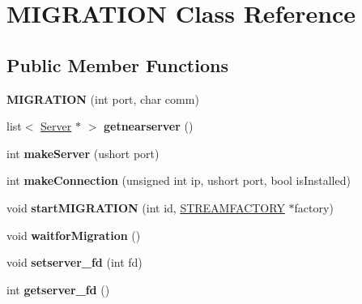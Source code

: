 \hypertarget{classMIGRATION}{}\section{M\+I\+G\+R\+A\+T\+I\+O\+N Class Reference}
\label{classMIGRATION}
\subsection*{Public Member Functions}
\begin{DoxyCompactItemize}
\item 
\hypertarget{classMIGRATION_aecd77ec132b2b7b8d8504d3502524e10}{}{\bfseries M\+I\+G\+R\+A\+T\+I\+O\+N} (int port, char comm)\label{classMIGRATION_aecd77ec132b2b7b8d8504d3502524e10}

\item 
\hypertarget{classMIGRATION_a1006cf4d6cb170d17dda179445125d14}{}list$<$ \hyperlink{structSERVER}{Server} $\ast$ $>$ {\bfseries getnearserver} ()\label{classMIGRATION_a1006cf4d6cb170d17dda179445125d14}

\item 
\hypertarget{classMIGRATION_a25103492408e6f7e7c5f26627d229804}{}int {\bfseries make\+Server} (ushort port)\label{classMIGRATION_a25103492408e6f7e7c5f26627d229804}

\item 
\hypertarget{classMIGRATION_a60edaac3b8203c13cf09353c678fe669}{}int {\bfseries make\+Connection} (unsigned int ip, ushort port, bool is\+Installed)\label{classMIGRATION_a60edaac3b8203c13cf09353c678fe669}

\item 
\hypertarget{classMIGRATION_a2c4e73d67f260b7a0c39192f4ad451f5}{}void {\bfseries start\+M\+I\+G\+R\+A\+T\+I\+O\+N} (int id, \hyperlink{classSTREAMFACTORY}{S\+T\+R\+E\+A\+M\+F\+A\+C\+T\+O\+R\+Y} $\ast$factory)\label{classMIGRATION_a2c4e73d67f260b7a0c39192f4ad451f5}

\item 
\hypertarget{classMIGRATION_aad4b3940495672fde4e12c894ab955c8}{}void {\bfseries waitfor\+Migration} ()\label{classMIGRATION_aad4b3940495672fde4e12c894ab955c8}

\item 
\hypertarget{classMIGRATION_ae24b1d486e36d7e505920a1980d84e6b}{}void {\bfseries setserver\+\_\+fd} (int fd)\label{classMIGRATION_ae24b1d486e36d7e505920a1980d84e6b}

\item 
\hypertarget{classMIGRATION_a59ced836a15663d210c596be12557f2f}{}int {\bfseries getserver\+\_\+fd} ()\label{classMIGRATION_a59ced836a15663d210c596be12557f2f}


\end{DoxyCompactItemize}
